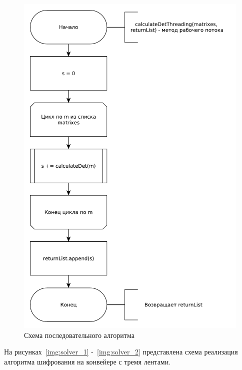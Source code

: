 \documentclass[12pt]{report}
\begin{document}
    \begin{figure}[H]
    	\centering
    	\includegraphics[width=0.85\linewidth]{img/thread_schema}
    	\caption{Схема последовательного алгоритма}
    	\label{img:thread_schema}
    \end{figure}
    
    На рисунках~\ref{img:solver_1} -~\ref{img:solver_2} представлена схема реализация алгоритма шифрования на конвейере с тремя лентами.
    
\end{document}
